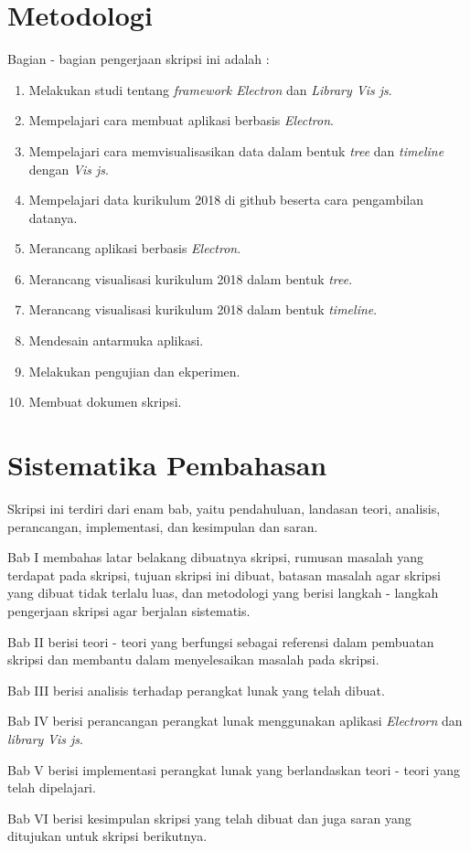 \section{Metodologi}
\label{sec:metlit}
Bagian - bagian pengerjaan skripsi ini adalah :
\begin{enumerate}
    \item Melakukan studi tentang \textit{framework Electron} dan \textit{Library Vis js}.
    \item Mempelajari cara membuat aplikasi berbasis \textit{Electron}.
    \item Mempelajari cara memvisualisasikan data dalam bentuk \textit{tree} dan \textit{timeline} dengan \textit{Vis js}.
    \item Mempelajari data kurikulum 2018 di github beserta cara pengambilan datanya.
    \item Merancang aplikasi berbasis \textit{Electron}.
    \item Merancang visualisasi kurikulum 2018 dalam bentuk \textit{tree}.
    \item Merancang visualisasi kurikulum 2018 dalam bentuk \textit{timeline}.
    \item Mendesain antarmuka aplikasi.
    \item Melakukan pengujian dan ekperimen.
    \item Membuat dokumen skripsi.
\end{enumerate}



\section{Sistematika Pembahasan}
\label{sec:sispem}
Skripsi ini terdiri dari enam bab, yaitu pendahuluan, landasan teori, analisis, perancangan, implementasi, dan kesimpulan dan saran. 

Bab I membahas latar belakang dibuatnya skripsi, rumusan masalah yang terdapat pada skripsi, tujuan skripsi ini dibuat, batasan masalah agar skripsi yang dibuat tidak terlalu luas, dan metodologi yang berisi langkah - langkah pengerjaan skripsi agar berjalan sistematis.

Bab II berisi teori - teori yang berfungsi sebagai referensi dalam pembuatan skripsi dan membantu dalam menyelesaikan masalah pada skripsi.

Bab III berisi analisis terhadap perangkat lunak yang telah dibuat.

Bab IV berisi perancangan perangkat lunak menggunakan aplikasi \textit{Electrorn} dan \textit{library} \textit{Vis js}.

Bab V berisi implementasi perangkat lunak yang berlandaskan teori - teori yang telah dipelajari.

Bab VI berisi kesimpulan skripsi yang telah dibuat dan juga saran yang ditujukan untuk skripsi berikutnya.

